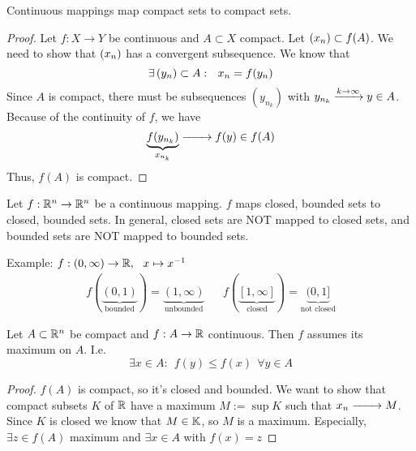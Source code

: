 \documentclass[../../script.tex]{subfiles}
\begin{document}
\begin{thm}
    Continuous mappings map compact sets to compact sets.
\end{thm}
\begin{proof}
    Let $f: X \rightarrow Y$ be continuous and $A \subset X$ compact. Let $\seq{x} \subset f(A)$. We need to show that $\seq{x}$ has a convergent subsequence.
    We know that 
    \begin{equation}
        \exists \anyseqdef[y]{A}: ~~x_n = f(y_n)
    \end{equation}
    Since $A$ is compact, there must be subsequences $(y_{n_k})$ with $y_{n_k} \conv{k \rightarrow \infty} y \in A$. Because of the continuity of $f$, we have 
    \begin{equation}
        \underbrace{f(y_{n_k})}_{x_{n_k}} \conv{} f(y) \in f(A)
    \end{equation}
    Thus, $f(A)$ is compact.
\end{proof}

\begin{rem}
    Let $f: \realn^n \rightarrow \realn^n$ be a continuous mapping. $f$ maps closed, bounded sets to closed, bounded sets.
    In general, closed sets are NOT mapped to closed sets, and bounded sets are NOT mapped to bounded sets.

    Example: $f: (0, \infty) \rightarrow \realn, ~~x \mapsto \inv{x}$
    \begin{align*}
        f(\underbrace{(0, 1)}_{\text{bounded}}) = \underbrace{(1, \infty)}_{\text{unbounded}} 
        && f(\underbrace{[1, \infty]}_{\text{closed}}) = \underbrace{(0, 1]}_{\text{not closed}}
    \end{align*}
\end{rem}

\begin{cor}
    Let $A \subset \realn^n$ be compact and $f: A \rightarrow \realn$ continuous. Then $f$ assumes its maximum on $A$. I.e.
    \[
        \exists x \in A: ~~f(y) \le f(x) ~~\forall y \in A
    \]
\end{cor}
\begin{proof}
    $f(A)$ is compact, so it's closed and bounded. We want to show that compact subsets $K$ of $\realn$ have a maximum $M := \sup K$
    such that $x_n \conv{} M$. Since $K$ is closed we know that $M \in \field$, so $M$ is a maximum.
    Especially, $\exists z \in f(A)$ maximum and $\exists x \in A$ with $f(x) = z$
\end{proof}
\end{document}
